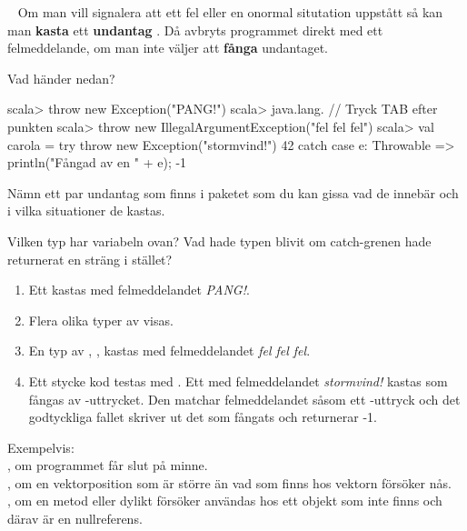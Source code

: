 \QUESTBEGIN

\Task  \what~  Om man vill signalera att ett fel eller en onormal situtation uppstått så kan man \textbf{kasta}  ett \textbf{undantag} . Då avbryts programmet direkt med ett felmeddelande, om man inte väljer att \textbf{fånga}  undantaget.

\Subtask Vad händer nedan?
\begin{REPL}
scala> throw new Exception("PANG!")
scala> java.lang.   // Tryck TAB efter punkten
scala> throw new IllegalArgumentException("fel fel fel")
scala> val carola = try {
         throw new Exception("stormvind!")
         42
       } catch { case e: Throwable => println("Fångad av en " + e); -1 }
\end{REPL}
\Subtask Nämn ett par undantag som finns i paketet  som du kan gissa vad de innebär och i vilka situationer de kastas.

\Subtask Vilken typ har variabeln  ovan? Vad hade typen blivit om catch-grenen hade returnerat en sträng i stället?

\SOLUTION


\TaskSolved \what


\SubtaskSolved  \begin{enumerate}
\item Ett  kastas med felmeddelandet \textit{PANG!}.
\item Flera olika typer av  visas.
\item En typ av , , kastas med felmeddelandet \textit{fel fel fel}.
\item Ett stycke kod testas med . Ett  med felmeddelandet \textit{stormvind!} kastas som fångas av -uttrycket. Den matchar felmeddelandet såsom ett -uttryck och det godtyckliga fallet  skriver ut det  som fångats och returnerar -1.
\end{enumerate}

\SubtaskSolved  Exempelvis: \\
, om programmet får slut på minne.\\
, om en vektorposition som är större än vad som finns hos vektorn försöker nås.\\
, om en metod eller dylikt försöker användas hos ett objekt som inte finns och därav är en nullreferens.

